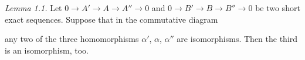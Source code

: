 \documentclass{article}
\begin{document}
\emph{Lemma 1.1.}
Let $0 \to A' \to A \to A'' \to 0$ and $0 \to B' \to B \to B'' \to 0$ be two short exact sequences.
Suppose that in the commutative diagram
\begin{center}
\end{center}
any two of the three homomorphisms $\alpha'$, $\alpha$, $\alpha''$ are isomorphisms.
Then the third is an isomorphism, too. \\
\end{document}
